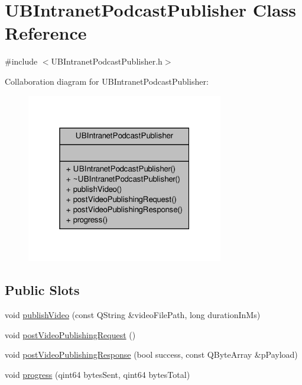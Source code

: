 \hypertarget{class_u_b_intranet_podcast_publisher}{\section{U\-B\-Intranet\-Podcast\-Publisher Class Reference}
\label{dc/d9f/class_u_b_intranet_podcast_publisher}
}


{\ttfamily \#include $<$U\-B\-Intranet\-Podcast\-Publisher.\-h$>$}



Collaboration diagram for U\-B\-Intranet\-Podcast\-Publisher\-:
\nopagebreak
\begin{figure}[H]
\begin{center}
\leavevmode
\includegraphics[width=244pt]{d4/d46/class_u_b_intranet_podcast_publisher__coll__graph}
\end{center}
\end{figure}
\subsection*{Public Slots}
\begin{DoxyCompactItemize}
\item 
void \hyperlink{class_u_b_intranet_podcast_publisher_a4965ecc747e29ef3c2a180d4078e1fbd}{publish\-Video} (const Q\-String \&video\-File\-Path, long duration\-In\-Ms)
\item 
void \hyperlink{class_u_b_intranet_podcast_publisher_a5bd46ab637671de895e047500f5eb975}{post\-Video\-Publishing\-Request} ()
\item 
void \hyperlink{class_u_b_intranet_podcast_publisher_acf2339af36b92c6d132dd15519c0b056}{post\-Video\-Publishing\-Response} (bool success, const Q\-Byte\-Array \&p\-Payload)
\item 
void \hyperlink{class_u_b_intranet_podcast_publisher_a24244249b2bc37c59c4b72d17b490cf0}{progress} (qint64 bytes\-Sent, qint64 bytes\-Total)
\end{DoxyCompactItemize}
